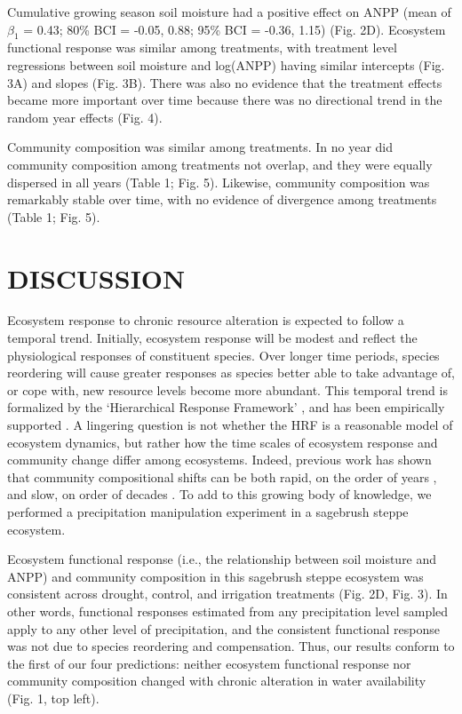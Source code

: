\documentclass[fleqn,10pt,lineno]{wlpeerj} %
\begin{document}
Cumulative growing season soil moisture had a positive effect on ANPP
(mean of \(\beta_{1}\) = 0.43; 80\% BCI = -0.05, 0.88; 95\% BCI = -0.36,
1.15) (Fig. 2D). Ecosystem functional response was similar among
treatments, with treatment level regressions between soil moisture and
log(ANPP) having similar intercepts (Fig. 3A) and slopes (Fig. 3B).
There was also no evidence that the treatment effects became more
important over time because there was no directional trend in the random
year effects (Fig. 4).

Community composition was similar among treatments. In no year did
community composition among treatments not overlap, and they were
equally dispersed in all years (Table 1; Fig. 5). Likewise, community
composition was remarkably stable over time, with no evidence of
divergence among treatments (Table 1; Fig. 5).

\section{DISCUSSION}\label{discussion}

Ecosystem response to chronic resource alteration is expected to follow
a temporal trend. Initially, ecosystem response will be modest and
reflect the physiological responses of constituent species. Over longer
time periods, species reordering will cause greater responses as species
better able to take advantage of, or cope with, new resource levels
become more abundant. This temporal trend is formalized by the
`Hierarchical Response Framework' \citep[HRF,][]{Smith2009}, and has
been empirically supported \citep{Knapp2012, Wilcox2016}. A lingering
question is not whether the HRF is a reasonable model of ecosystem
dynamics, but rather how the time scales of ecosystem response and
community change differ among ecosystems. Indeed, previous work has
shown that community compositional shifts can be both rapid, on the
order of years \citep{Hoover2014}, and slow, on order of decades
\citep{Knapp2012, Wilcox2016}. To add to this growing body of knowledge,
we performed a precipitation manipulation experiment in a sagebrush
steppe ecosystem.

Ecosystem functional response (i.e., the relationship between soil
moisture and ANPP) and community composition in this sagebrush steppe
ecosystem was consistent across drought, control, and irrigation
treatments (Fig. 2D, Fig. 3). In other words, functional responses
estimated from any precipitation level sampled apply to any other level
of precipitation, and the consistent functional response was not due to
species reordering and compensation. Thus, our results conform to the
first of our four predictions: neither ecosystem functional response nor
community composition changed with chronic alteration in water
availability (Fig. 1, top left).
\end{document}
